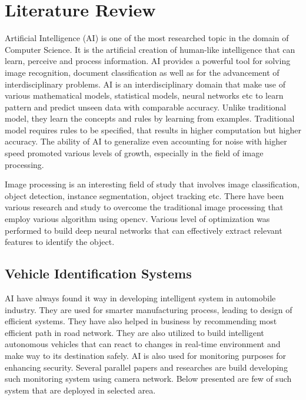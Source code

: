 \chapter{Literature Review} 
Artificial Intelligence (AI) is one of the most researched topic in the domain of Computer Science. It is the artificial creation of human-like intelligence that can learn, perceive and process information. AI provides a powerful tool for solving image recognition, document classification as well as for the advancement of interdisciplinary problems. AI is an interdisciplinary domain that make use of various mathematical models, statistical models, neural networks etc to learn pattern and predict unseen data with comparable accuracy. Unlike traditional model, they learn the concepts and rules by learning from examples. Traditional model requires rules to be specified, that results in higher computation but higher accuracy. The ability of AI to generalize even accounting for noise with higher speed promoted various levels of growth, especially in the field of image processing.

Image processing is an interesting field of study that involves image classification, object detection, instance segmentation, object tracking etc. There have been various research and study \cite{diff_algo} to overcome the traditional image processing that employ various algorithm using opencv. Various level of optimization was performed to build deep neural networks that can effectively extract relevant features to identify the object.

\section{Vehicle Identification Systems}
AI have always found it way in developing intelligent system in automobile industry. They are used for smarter manufacturing process, leading to design of efficient systems. They have also helped in business by recommending most efficient path in road network. They are also utilized to build intelligent autonomous vehicles that can react to changes in real-time environment and make way to its destination safely. AI is also used for monitoring purposes for enhancing security. Several parallel papers and researches are build developing such monitoring system using camera network. Below presented are few of such system that are deployed in selected area.

